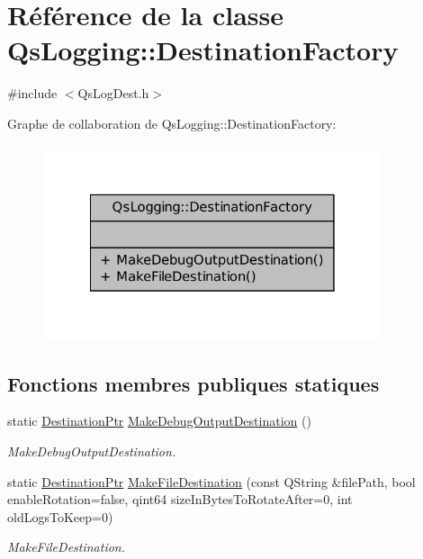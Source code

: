 \hypertarget{classQsLogging_1_1DestinationFactory}{\section{Référence de la classe Qs\-Logging\-:\-:Destination\-Factory}
\label{classQsLogging_1_1DestinationFactory}
}


{\ttfamily \#include $<$Qs\-Log\-Dest.\-h$>$}



Graphe de collaboration de Qs\-Logging\-:\-:Destination\-Factory\-:
\nopagebreak
\begin{figure}[H]
\begin{center}
\leavevmode
\includegraphics[width=282pt]{classQsLogging_1_1DestinationFactory__coll__graph}
\end{center}
\end{figure}
\subsection*{Fonctions membres publiques statiques}
\begin{DoxyCompactItemize}
\item 
static \hyperlink{namespaceQsLogging_a8fe41cf859d617f1c23515f804d1e8ec}{Destination\-Ptr} \hyperlink{classQsLogging_1_1DestinationFactory_a69eecb9933440870bb809c4e32ac1987}{Make\-Debug\-Output\-Destination} ()
\begin{DoxyCompactList}\small\item\em Make\-Debug\-Output\-Destination. \end{DoxyCompactList}\item 
static \hyperlink{namespaceQsLogging_a8fe41cf859d617f1c23515f804d1e8ec}{Destination\-Ptr} \hyperlink{classQsLogging_1_1DestinationFactory_abc128b6640d5716b91c681df960b878c}{Make\-File\-Destination} (const Q\-String \&file\-Path, bool enable\-Rotation=false, qint64 size\-In\-Bytes\-To\-Rotate\-After=0, int old\-Logs\-To\-Keep=0)
\begin{DoxyCompactList}\small\item\em Make\-File\-Destination. \end{DoxyCompactList}\end{DoxyCompactItemize}



